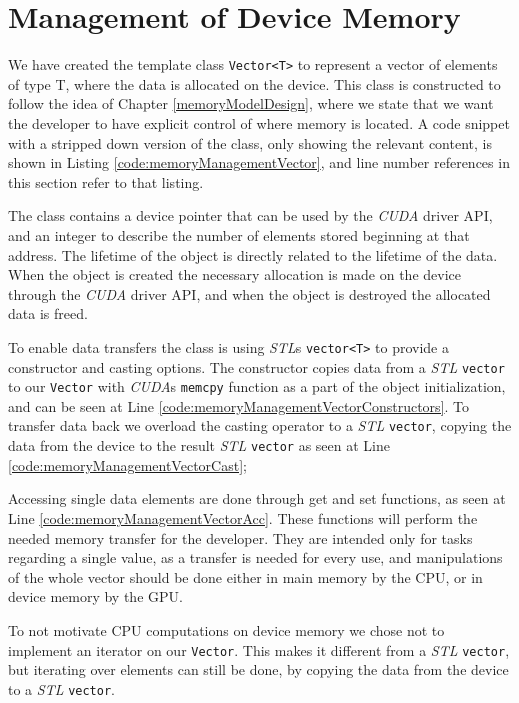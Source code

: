 \section{Management of Device Memory}
We have created the template class \texttt{Vector<T>} to represent a vector of elements of type T, where the data is allocated on the device. This class is constructed to follow the idea of Chapter \ref{memoryModelDesign}, where we state that we want the developer to have explicit control of where memory is located. A code snippet with a stripped down version of the class, only showing the relevant content, is shown in Listing \ref{code:memoryManagementVector}, and line number references in this section refer to that listing.

The class contains a device pointer that can be used by the \textit{CUDA} driver API, and an integer to describe the number of elements stored beginning at that address. The lifetime of the object is directly related to the lifetime of the data. When the object is created the necessary allocation is made on the device through the \textit{CUDA} driver API, and when the object is destroyed the allocated data is freed.

To enable data transfers the class is using \textit{STL}s \texttt{vector<T>} to provide a constructor and casting options. The constructor copies data from a \textit{STL} \texttt{vector} to our \texttt{Vector} with \textit{CUDA}s \texttt{memcpy} function as a part of the object initialization, and can be seen at Line \ref{code:memoryManagementVectorConstructors}. To transfer data back we overload the casting operator to a \textit{STL} \texttt{vector}, copying the data from the device to the result \textit{STL} \texttt{vector} as seen at Line \ref{code:memoryManagementVectorCast};

Accessing single data elements are done through get and set functions, as seen at Line \ref{code:memoryManagementVectorAcc}. These functions will perform the needed memory transfer for the developer. They are intended only for tasks regarding a single value, as a transfer is needed for every use, and manipulations of the whole vector should be done either in main memory by the CPU, or in device memory by the GPU.

To not motivate CPU computations on device memory we chose not to implement an iterator on our \texttt{Vector}. This makes it different from a \textit{STL} \texttt{vector}, but iterating over elements can still be done, by copying the data from the device to a \textit{STL} \texttt{vector}.

